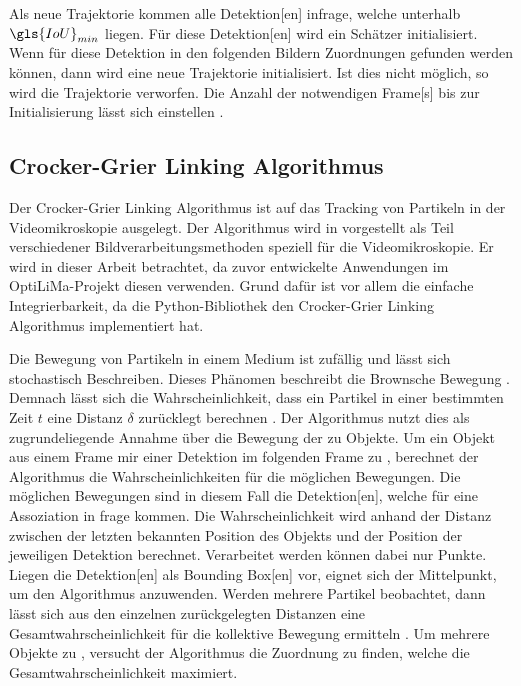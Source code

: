 Als neue \gls{Trajektorie} kommen alle \gls{Detektion}[en] infrage, welche unterhalb \(\gls{IoU}_{min}\) liegen. Für diese \gls{Detektion}[en] wird ein Schätzer initialisiert. Wenn für diese \gls{Detektion} in den folgenden Bildern Zuordnungen gefunden werden können, dann wird eine neue \gls{Trajektorie} initialisiert. Ist dies nicht möglich, so wird die \gls{Trajektorie} verworfen. Die Anzahl der notwendigen \gls{Frame}[s] bis zur Initialisierung lässt sich einstellen \cite{Bewley.2016}.

\subsection{Crocker-Grier Linking Algorithmus} \label{sec:MOT CrockGrier}
Der Crocker-Grier Linking Algorithmus ist auf das Tracking von Partikeln in der Videomikroskopie ausgelegt. Der Algorithmus wird in \cite{Crocker.1996} vorgestellt als Teil verschiedener Bildverarbeitungsmethoden speziell für die Videomikroskopie. Er wird in dieser Arbeit betrachtet, da zuvor entwickelte Anwendungen im \acrshort{OptiLiMa}-Projekt diesen verwenden. Grund dafür ist vor allem die einfache Integrierbarkeit, da die \gls{Python}-\gls{Bibliothek} \cite{Allan.2023} den Crocker-Grier Linking Algorithmus implementiert hat.\par

Die Bewegung von Partikeln in einem Medium ist zufällig und lässt sich stochastisch Beschreiben. Dieses Phänomen beschreibt die \gls{Brownsche Bewegung} \cite{Nelson.1972}. Demnach lässt sich die Wahrscheinlichkeit, dass ein Partikel in einer bestimmten Zeit \(t\) eine Distanz \(\delta\) zurücklegt berechnen \cite{Crocker.1996}. Der Algorithmus nutzt dies als zugrundeliegende Annahme über die Bewegung der zu  Objekte. Um ein Objekt aus einem \gls{Frame} mir einer \gls{Detektion} im folgenden \gls{Frame} zu , berechnet der Algorithmus die Wahrscheinlichkeiten für die möglichen Bewegungen. Die möglichen Bewegungen sind in diesem Fall die \gls{Detektion}[en], welche für eine \gls{Assoziation} in frage kommen. Die Wahrscheinlichkeit wird anhand der Distanz zwischen der letzten bekannten Position des Objekts und der Position der jeweiligen \gls{Detektion} berechnet. Verarbeitet werden können dabei nur Punkte. Liegen die \gls{Detektion}[en] als \gls{Bounding Box}[en] vor, eignet sich der Mittelpunkt, um den Algorithmus anzuwenden. Werden mehrere Partikel beobachtet, dann lässt sich aus den einzelnen zurückgelegten Distanzen eine Gesamtwahrscheinlichkeit für die kollektive Bewegung ermitteln \cite{Crocker.1996}. Um mehrere Objekte zu , versucht der Algorithmus die Zuordnung zu finden, welche die Gesamtwahrscheinlichkeit maximiert. \par

